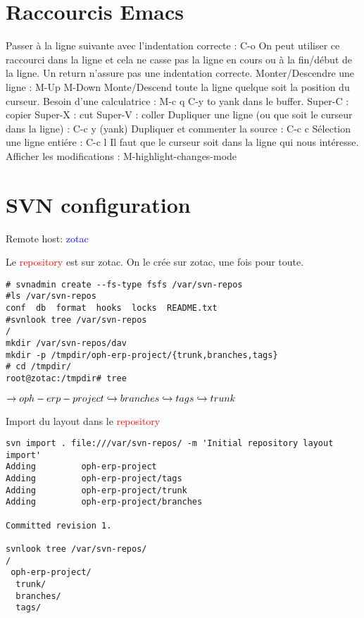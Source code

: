 \documentclass[12pt,a4paper]{article}
\begin{document}
\tableofcontents

\section{Raccourcis Emacs}
\label{sec:racemacs}

Passer à la ligne suivante avec l’indentation correcte : C-o
On peut utiliser ce raccourci dans la ligne et cela ne casse pas la ligne en cours ou à la fin/début de la ligne. Un return n’assure pas une
indentation correcte. Monter/Descendre une ligne : M-Up M-Down
Monte/Descend toute la ligne quelque soit la position du curseur.
Besoin d’une calculatrice : M-c q
C-y to yank dans le buffer.
Super-C : copier
Super-X : cut
Super-V : coller
Dupliquer une ligne (ou que soit le curseur dans la ligne) : C-c y (yank)
Dupliquer et commenter la source : C-c c
Sélection une ligne entiére : C-c l
Il faut que le curseur soit dans la ligne qui nous intéresse.
Afficher les modifications : M-highlight-changes-mode



\section{SVN configuration}



Remote host: \textcolor{blue}{zotac}

Le \textcolor{red}{repository} est sur zotac. On le crée sur zotac, une fois pour toute.

\begin{verbatim}
# svnadmin create --fs-type fsfs /var/svn-repos
#ls /var/svn-repos
conf  db  format  hooks  locks  README.txt
#svnlook tree /var/svn-repos
/
mkdir /var/svn-repos/dav
mkdir -p /tmpdir/oph-erp-project/{trunk,branches,tags}
# cd /tmpdir/
root@zotac:/tmpdir# tree
\end{verbatim}

$\rightarrow oph-erp-project\\
    \hookrightarrow branches\\
    \hookrightarrow tags\\
    \hookrightarrow trunk\\$


Import du layout dans le  \textcolor{red}{repository}

\begin{verbatim}
svn import . file:///var/svn-repos/ -m 'Initial repository layout import'
Adding         oph-erp-project
Adding         oph-erp-project/tags
Adding         oph-erp-project/trunk
Adding         oph-erp-project/branches

Committed revision 1.

svnlook tree /var/svn-repos/
/
 oph-erp-project/
  trunk/
  branches/
  tags/
\end{verbatim}
\end{document}

